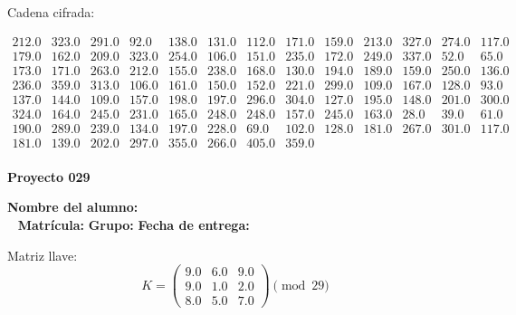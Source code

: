 \documentclass[12pt]{article}
\begin{document}
Cadena cifrada:
\begin{center}
$\begin{array}{lllllllllllll}
212.0 & 323.0 & 291.0 & 92.0 & 138.0 & 131.0 & 112.0 & 171.0 & 159.0 & 213.0 & 327.0 & 274.0 & 117.0\\
179.0 & 162.0 & 209.0 & 323.0 & 254.0 & 106.0 & 151.0 & 235.0 & 172.0 & 249.0 & 337.0 & 52.0 & 65.0\\
173.0 & 171.0 & 263.0 & 212.0 & 155.0 & 238.0 & 168.0 & 130.0 & 194.0 & 189.0 & 159.0 & 250.0 & 136.0\\
236.0 & 359.0 & 313.0 & 106.0 & 161.0 & 150.0 & 152.0 & 221.0 & 299.0 & 109.0 & 167.0 & 128.0 & 93.0\\
137.0 & 144.0 & 109.0 & 157.0 & 198.0 & 197.0 & 296.0 & 304.0 & 127.0 & 195.0 & 148.0 & 201.0 & 300.0\\
324.0 & 164.0 & 245.0 & 231.0 & 165.0 & 248.0 & 248.0 & 157.0 & 245.0 & 163.0 & 28.0 & 39.0 & 61.0\\
190.0 & 289.0 & 239.0 & 134.0 & 197.0 & 228.0 & 69.0 & 102.0 & 128.0 & 181.0 & 267.0 & 301.0 & 117.0\\
181.0 & 139.0 & 202.0 & 297.0 & 355.0 & 266.0 & 405.0 & 359.0\\
\end{array}$
\end{center}

\newpage


\textbf{Proyecto 029}

\textbf{Nombre del alumno:} \underline{\hspace{13cm}}\\\
\vspace{1cm}
\textbf{Matrícula:} \underline{\hspace{4cm}} \hspace{1cm}
\textbf{Grupo:} \underline{\hspace{2cm}}
\textbf{Fecha de entrega:} \underline{\hspace{2cm}}

\medskip

Matriz llave:
\[
K = \begin{pmatrix}
9.0 & 6.0 & 9.0\\
9.0 & 1.0 & 2.0\\
8.0 & 5.0 & 7.0
\end{pmatrix} \pmod{29}
\]
\end{document}
